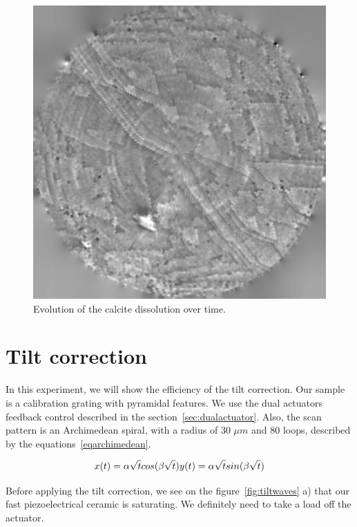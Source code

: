 \begin{figure}[!ht]
\endminipage\hfill
{}%
  	\includegraphics[width=\linewidth]{images/006_X10s50l10m_MOv2_1007.png}
\endminipage
\caption{Evolution of the calcite dissolution over time.} \label{fig:cd1}

\end{figure}


\section{Tilt correction}

In this experiment, we will show the efficiency of the tilt correction. Our sample is a calibration grating with pyramidal features. We use the dual actuators feedback control described in the section~\ref{sec:dualactuator}. Also, the scan pattern is an Archimedean spiral, with a radius of 30 $\mu m$ and 80 loops, described by the equations~\ref{eqarchimedean}.

\begin{equation}\label{eqarchimedean}
x(t)= \alpha \sqrt{t} cos(\beta \sqrt{t})\\
y(t)= \alpha \sqrt{t} sin(\beta \sqrt{t})
\end{equation}

Before applying the tilt correction, we see on the figure~\ref{fig:tiltwaves} a) that our fast piezoelectrical ceramic is saturating. We definitely need to take a load off the actuator.

